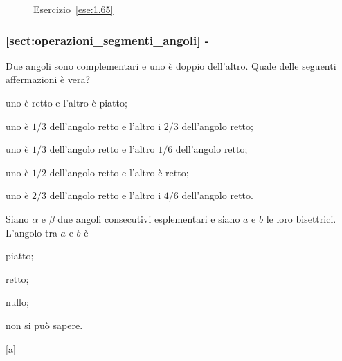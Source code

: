 \begin{inaccessibleblock}
 \begin{figure}[htb]
 \centering
 \caption{Esercizio~\ref{ese:1.65}}\label{fig:ese1.65}
\end{figure}
\end{inaccessibleblock}

\begingroup
\hypersetup{linkcolor=black}
\subsubsection*{\ref{sect:operazioni_segmenti_angoli} - 
}
\endgroup

\begin{esercizio}
\label{ese:1.66}
Due angoli sono complementari e uno è doppio dell'altro. Quale delle 
seguenti affermazioni è vera?
\begin{enumeratea}
\item uno è retto e l'altro è piatto;
\item uno è $1/3$ dell'angolo retto e l'altro i $2/3$ dell'angolo 
retto;
\item uno è $1/3$ dell'angolo retto e l'altro $1/6$ dell'angolo retto;
\item uno è $1/2$ dell'angolo retto e l'altro è retto;
\item uno è $2/3$ dell'angolo retto e l'altro i $4/6$ dell'angolo 
retto.
\end{enumeratea}
\end{esercizio}

\begin{esercizio}
\label{ese:1.67}
Siano $\alpha$ e $\beta$ due angoli consecutivi esplementari e siano 
$a$ e $b$ le loro bisettrici. L'angolo tra $a$ e $b$ è
\begin{multicols}{2}
\begin{enumeratea}
\item piatto;
\item retto;
\item nullo;
\item non si può sapere.
\end{enumeratea}
\end{multicols}
\hfill[a]
\end{esercizio}

